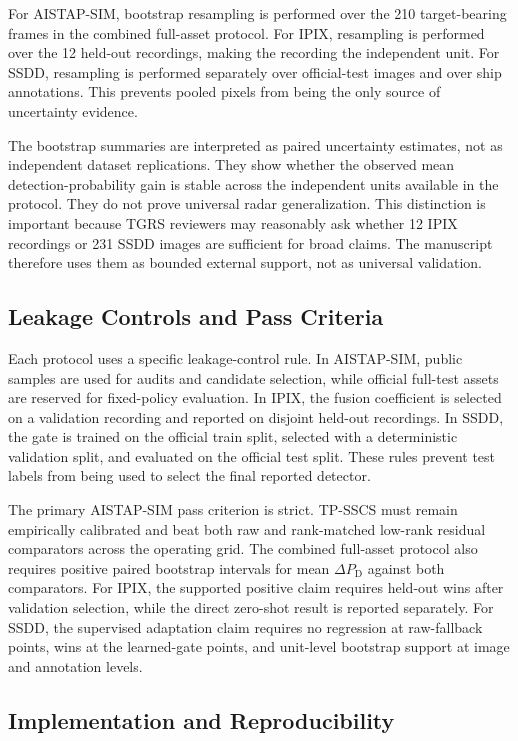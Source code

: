 \documentclass[journal]{IEEEtran}
\begin{document}
For AISTAP-SIM, bootstrap resampling is performed over the 210 target-bearing frames in the combined full-asset protocol. For IPIX, resampling is performed over the 12 held-out recordings, making the recording the independent unit. For SSDD, resampling is performed separately over official-test images and over ship annotations. This prevents pooled pixels from being the only source of uncertainty evidence.

The bootstrap summaries are interpreted as paired uncertainty estimates, not as independent dataset replications. They show whether the observed mean detection-probability gain is stable across the independent units available in the protocol. They do not prove universal radar generalization. This distinction is important because TGRS reviewers may reasonably ask whether 12 IPIX recordings or 231 SSDD images are sufficient for broad claims. The manuscript therefore uses them as bounded external support, not as universal validation.

\subsection{Leakage Controls and Pass Criteria}

Each protocol uses a specific leakage-control rule. In AISTAP-SIM, public samples are used for audits and candidate selection, while official full-test assets are reserved for fixed-policy evaluation. In IPIX, the fusion coefficient is selected on a validation recording and reported on disjoint held-out recordings. In SSDD, the gate is trained on the official train split, selected with a deterministic validation split, and evaluated on the official test split. These rules prevent test labels from being used to select the final reported detector.

The primary AISTAP-SIM pass criterion is strict. TP-SSCS must remain empirically calibrated and beat both raw and rank-matched low-rank residual comparators across the operating grid. The combined full-asset protocol also requires positive paired bootstrap intervals for mean $\Delta P_{\mathrm{D}}$ against both comparators. For IPIX, the supported positive claim requires held-out wins after validation selection, while the direct zero-shot result is reported separately. For SSDD, the supervised adaptation claim requires no regression at raw-fallback points, wins at the learned-gate points, and unit-level bootstrap support at image and annotation levels.

\subsection{Implementation and Reproducibility}
\end{document}
